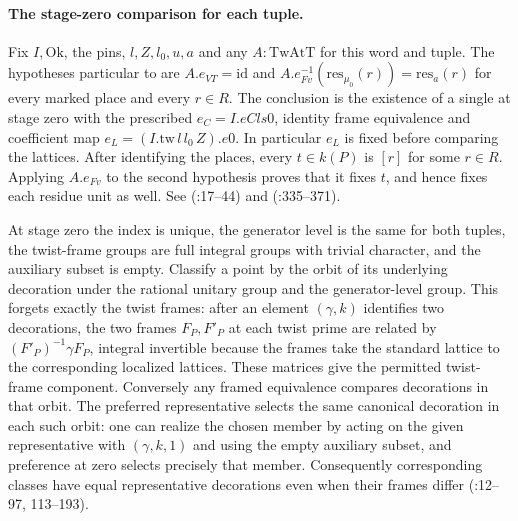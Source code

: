 \paragraph{The stage-zero comparison for each tuple.}\label{r13:lv-zero}
Fix $I,\mathrm{Ok}$, the pins, $l,Z,l_0,u,a$ and any
$A:\mathrm{TwAtT}$ for this word and tuple. The hypotheses particular
to  are $A.e_{VT}=\mathrm{id}$ and
$A.e_{Fv}^{-1}(\mathrm{res}_{\mu_0}(r))=\mathrm{res}_a(r)$
for every marked place and every $r\in R$. The conclusion is the
existence of a single  at stage zero with the prescribed
$e_C=I.eCls0$, identity frame equivalence and coefficient map
$e_L=(I.\mathrm{tw}\,l\,l_0\,Z).e0$. In particular $e_L$ is fixed
before comparing the lattices. After identifying the places,
every $t\in k(P)$ is $[r]$ for some $r\in R$. Applying $A.e_{Fv}$
to the second hypothesis proves that it fixes $t$, and hence fixes
each residue unit as well. See 
(:17--44)
and  (:335--371).

At stage zero the index is unique, the generator level is the same
for both tuples, the twist-frame groups are full integral groups
with trivial character, and the auxiliary subset is empty. Classify
a point by the orbit of its underlying decoration under the rational
unitary group and the generator-level group. This forgets exactly the
twist frames: after an element $(\gamma,k)$ identifies two
decorations, the two frames $F_P,F'_P$ at each twist prime are related
by $(F'_P)^{-1}\gamma F_P$, integral invertible because the frames take
the standard lattice to the corresponding localized lattices.
These matrices give the permitted twist-frame component. Conversely
any framed equivalence compares decorations in that orbit.
The preferred representative selects the same canonical decoration
in each such orbit: one can realize the chosen member by acting on the
given representative with $(\gamma,k,1)$ and using the empty auxiliary
subset, and preference at zero selects precisely that member.
Consequently corresponding classes have equal representative
decorations even when their frames differ
(:12--97, 113--193).

